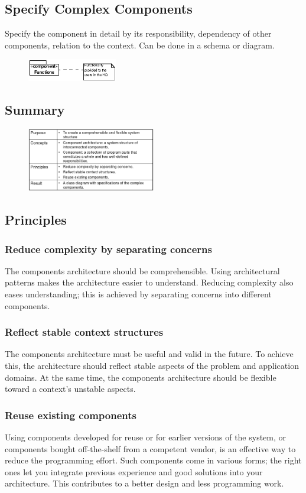 \subsection{Specify Complex Components}
Specify the component in detail by its responsibility, dependency of other components, relation to the context. Can be done in a schema or diagram. 
\begin{figure}[H]
    \centering
    \includegraphics[width=0.35\textwidth]{figures/complexcomponents.png}
\end{figure}

\subsection{Summary}
\begin{figure}[H]
    \centering
    \includegraphics[width=0.5\textwidth]{figures/componentssummary.png}
\end{figure}

\subsection{Principles}
\subsubsection{Reduce complexity by separating concerns}
The components architecture should be comprehensible. Using architectural patterns makes the architecture easier to understand. Reducing complexity also eases understanding; this is achieved by separating concerns into different components.

\subsubsection{Reflect stable context structures}
The components architecture must be useful and valid in the future. To achieve this, the architecture should reflect stable aspects of the problem and application domains. At the same time, the components architecture should be flexible toward a context's unstable aspects.

\subsubsection{Reuse existing components}
Using components developed for reuse or for earlier versions of the system, or components bought off-the-shelf from a competent vendor, is an effective way to reduce the programming effort. Such components come in various forms; the right ones let you integrate previous experience and good solutions into your architecture. This contributes to a better design and less programming work.